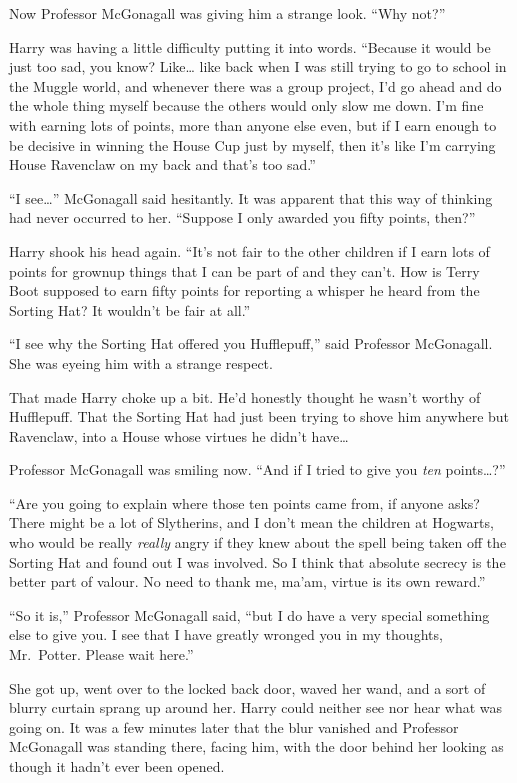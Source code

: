 Now Professor McGonagall was giving him a strange look. ``Why not?''

Harry was having a little difficulty putting it into words. ``Because it
would be just too sad, you know? Like\ldots{} like back when I was still
trying to go to school in the Muggle world, and whenever there was a
group project, I'd go ahead and do the whole thing myself because the
others would only slow me down. I'm fine with earning lots of points,
more than anyone else even, but if I earn enough to be decisive in
winning the House Cup just by myself, then it's like I'm carrying House
Ravenclaw on my back and that's too sad.''

``I see\ldots{}'' McGonagall said hesitantly. It was apparent that this
way of thinking had never occurred to her. ``Suppose I only awarded you
fifty points, then?''

Harry shook his head again. ``It's not fair to the other children if I
earn lots of points for grownup things that I can be part of and they
can't. How is Terry Boot supposed to earn fifty points for reporting a
whisper he heard from the Sorting Hat? It wouldn't be fair at all.''

``I see why the Sorting Hat offered you Hufflepuff,'' said Professor
McGonagall. She was eyeing him with a strange respect.

That made Harry choke up a bit. He'd honestly thought he wasn't worthy
of Hufflepuff. That the Sorting Hat had just been trying to shove him
anywhere but Ravenclaw, into a House whose virtues he didn't
have\ldots{}

Professor McGonagall was smiling now. ``And if I tried to give you
\emph{ten} points\ldots{}?''

``Are you going to explain where those ten points came from, if anyone
asks? There might be a lot of Slytherins, and I don't mean the children
at Hogwarts, who would be really \emph{really} angry if they knew about
the spell being taken off the Sorting Hat and found out I was involved.
So I think that absolute secrecy is the better part of valour. No need
to thank me, ma'am, virtue is its own reward.''

``So it is,'' Professor McGonagall said, ``but I do have a very special
something else to give you. I see that I have greatly wronged you in my
thoughts, Mr.~Potter. Please wait here.''

She got up, went over to the locked back door, waved her wand, and a
sort of blurry curtain sprang up around her. Harry could neither see nor
hear what was going on. It was a few minutes later that the blur
vanished and Professor McGonagall was standing there, facing him, with
the door behind her looking as though it hadn't ever been opened.

